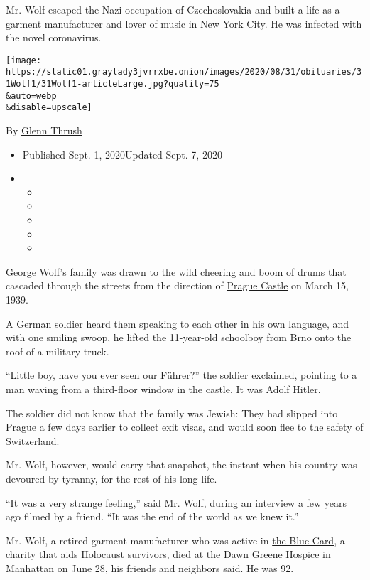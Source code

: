 Mr. Wolf escaped the Nazi occupation of Czechoslovakia and built a life
as a garment manufacturer and lover of music in New York City. He was
infected with the novel coronavirus.

\texttt{[image: https://static01.graylady3jvrrxbe.onion/images/2020/08/31/obituaries/31Wolf1/31Wolf1-articleLarge.jpg?quality=75\\\&auto=webp\\\&disable=upscale]}

By \href{https://www.nytimes3xbfgragh.onion/by/glenn-thrush}{Glenn
Thrush}

\begin{itemize}
\item
  Published Sept. 1, 2020Updated Sept. 7, 2020
\item
  \begin{itemize}
  \item
  \item
  \item
  \item
  \item
  \end{itemize}
\end{itemize}

George Wolf's family was drawn to the wild cheering and boom of drums
that cascaded through the streets from the direction of
\href{https://www.hrad.cz/en/prague-castle-for-visitors}{Prague Castle}
on March 15, 1939.

A German soldier heard them speaking to each other in his own language,
and with one smiling swoop, he lifted the 11-year-old schoolboy from
Brno onto the roof of a military truck.

``Little boy, have you ever seen our Führer?'' the soldier exclaimed,
pointing to a man waving from a third-floor window in the castle. It was
Adolf Hitler.

The soldier did not know that the family was Jewish: They had slipped
into Prague a few days earlier to collect exit visas, and would soon
flee to the safety of Switzerland.

Mr. Wolf, however, would carry that snapshot, the instant when his
country was devoured by tyranny, for the rest of his long life.

``It was a very strange feeling,'' said Mr. Wolf, during an interview a
few years ago filmed by a friend. ``It was the end of the world as we
knew it.''

Mr. Wolf, a retired garment manufacturer who was active in
\href{https://www.bluecardfund.org/}{the Blue Card}, a charity that aids
Holocaust survivors, died at the Dawn Greene Hospice in Manhattan on
June 28, his friends and neighbors said. He was 92.

